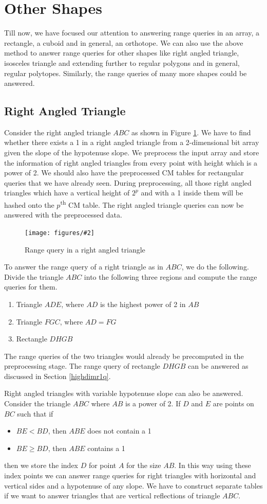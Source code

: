 \documentclass{article}
\newcommand{\addpicture}[4]
{ \begin{figure}[H] \centering \texttt{[image: figures/\#2]} \caption{#4} \label{#3}  \end{figure} }
\begin{document}
\section{Other Shapes}
Till now, we have focused our attention to answering range queries in an array, a rectangle, a cuboid and in general, an orthotope. We can also use the above method to answer range queries for other shapes like right angled triangle, isosceles triangle and extending further to regular polygons and in general, regular polytopes. Similarly, the range queries of many more shapes could be answered.

\subsection{Right Angled Triangle}
Consider the right angled triangle $ABC$ as shown in Figure \ref{righttriangle}. We have to find whether there exists a 1 in a right angled triangle from a 2-dimensional bit array given the slope of the hypotenuse slope. We preprocess the input array and store the information of right angled triangles from every point with height which is a power of 2. We should also have the preprocessed CM tables for rectangular queries that we have already seen. During preprocessing, all those right angled triangles which have a vertical height of $2^p$ and with a 1 inside them will be hashed onto the $p$\textsuperscript{th} CM table. The right angled triangle queries can now be answered with the preprocessed data.

\addpicture{width=1.4in}{righttriangle.png}{righttriangle}{Range query in a right angled triangle}

To answer the range query of a right triangle as in $ABC$, we do the following. Divide the triangle $ABC$ into the following three regions and compute the range queries for them. 
\begin{enumerate}
\item Triangle $ADE$, where $AD$ is the highest power of 2 in $AB$
\item Triangle $FGC$, where $AD = FG$
\item Rectangle $DHGB$
\end{enumerate}
The range queries of the two triangles would already be precomputed in the preprocessing stage. The range query of rectangle $DHGB$ can be answered as discussed in Section \ref{highdimr1q}.

Right angled triangles with variable hypotenuse slope can also be answered. Consider the triangle $ABC$ where $AB$ is a power of 2. If $D$ and $E$ are points on $BC$ such that if
\begin{itemize}
\item $BE < BD$, then $ABE$ does not contain a 1
\item $BE \ge BD$, then $ABE$ contains a 1
\end{itemize}
then we store the index $D$ for point $A$ for the size $AB$. In this way using these index points we can answer range queries for right triangles with horizontal and vertical sides and a hypotenuse of any slope. We have to construct separate tables if we want to answer triangles that are vertical reflections of triangle $ABC$.
\end{document}
